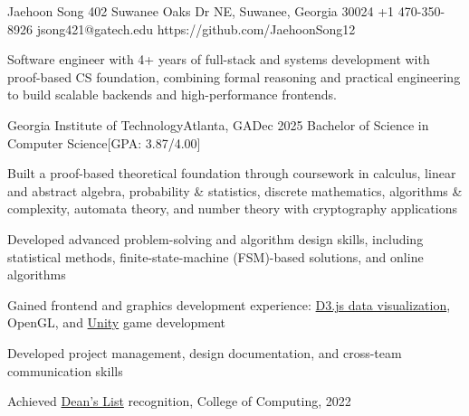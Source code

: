 % 
\begin{resume-header}{Jaehoon Song}
  {402 Suwanee Oaks Dr NE, Suwanee, Georgia 30024}
  {+1 470-350-8926}
  {jsong421@gatech.edu}
  {https://github.com/JaehoonSong12}
\end{resume-header}
\begin{resume-objective}
Software engineer with 4+ years of full-stack and systems development  
with proof-based CS foundation, combining formal reasoning and practical 
engineering to build scalable backends and high-performance frontends.
\end{resume-objective}
\begin{resume-itemize}
  {Georgia Institute of Technology}{Atlanta, GA}{Dec 2025}
  {Bachelor of Science in Computer Science}[GPA: 3.87/4.00]
    \item Built a proof-based theoretical foundation through coursework in calculus, 
    linear and abstract algebra, probability \& statistics, discrete mathematics, 
    algorithms \& complexity, automata theory, and number theory with cryptography applications
    \item Developed advanced problem-solving and algorithm design skills, 
    including statistical methods, finite-state-machine (FSM)-based solutions, 
    and online algorithms
    \item Gained frontend and graphics development experience: 
    \href{https://jaehoonsong12.github.io/}{D3.js data visualization}, OpenGL, 
    and \href{https://github.com/YundaeLeeSong/ydjs-references/tree/main/project2409-game_shadowwalker}{Unity} 
    game development
    \item Developed project management, design documentation, and 
    cross-team communication skills
    \item Achieved \href{https://gatech.meritpages.com/stories/Jaehoon-Song-Named-to-Dean-s-List-at-Georgia-Tech-for-the-Summer-2022-Semester/104219189}{Dean's List} recognition, College of Computing, 2022
\end{resume-itemize}
